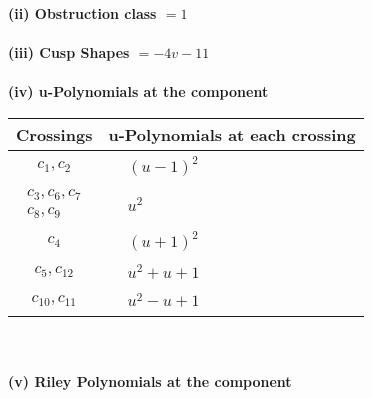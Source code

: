 \documentclass[1p]{elsarticle_modified}
\theoremstyle{definition}
\begin{document}
\flushleft \textbf{(ii) Obstruction class $= 1$}\\~\\
\flushleft \textbf{(iii) Cusp Shapes $= -4 v-11$}\\~\\
\newpage\renewcommand{\arraystretch}{1}
\flushleft \textbf{(iv) u-Polynomials at the component}\newline \\
\begin{tabular}{m{50pt}|m{274pt}}
Crossings & \hspace{64pt}u-Polynomials at each crossing \\
\hline $$\begin{aligned}c_{1},c_{2}\end{aligned}$$&$\begin{aligned}
&(u-1)^2
\end{aligned}$\\
\hline $$\begin{aligned}c_{3},c_{6},c_{7}\\c_{8},c_{9}\end{aligned}$$&$\begin{aligned}
&u^2
\end{aligned}$\\
\hline $$\begin{aligned}c_{4}\end{aligned}$$&$\begin{aligned}
&(u+1)^2
\end{aligned}$\\
\hline $$\begin{aligned}c_{5},c_{12}\end{aligned}$$&$\begin{aligned}
&u^2+u+1
\end{aligned}$\\
\hline $$\begin{aligned}c_{10},c_{11}\end{aligned}$$&$\begin{aligned}
&u^2- u+1
\end{aligned}$\\
\hline
\end{tabular}\\~\\
\newpage\renewcommand{\arraystretch}{1}
\flushleft \textbf{(v) Riley Polynomials at the component}\newline \\
\end{document}
